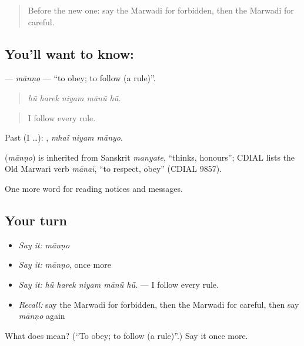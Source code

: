 \label{lesson:MW-C191-manno}



\begin{quote}
Before the new one: say the Marwadi for forbidden, then the Marwadi for careful.
\end{quote}

\subsection*{You'll want to know: }
\textbf{} — \emph{mānṇo} — \textquotedblleft{}to obey; to follow (a rule)\textquotedblright{}.

\begin{quote}
    
\end{quote}

\begin{quote}
\emph{hū̃ harek niyam mānū̃ hū̃.}
\end{quote}

\begin{quote}
I follow every rule.
\end{quote}

Past (I …):   , \emph{mhaĩ niyam mānyo}.

\begin{cousinweb}
\textbf{} (\emph{mānṇo}) is inherited from Sanskrit \emph{manyate}, \textquotedblleft{}thinks, honours\textquotedblright{}; CDIAL lists the Old Marwari verb \emph{mānaï}, \textquotedblleft{}to respect, obey\textquotedblright{} (CDIAL 9857).
\end{cousinweb}

\begin{grammarlens}[title={What you've built}]
One more word for reading notices and messages.
\end{grammarlens}

\subsection*{Your turn}
\begin{itemize}
\raggedright
  \item \emph{Say it:} \emph{mānṇo}
  \item \emph{Say it:} \emph{mānṇo}, once more
  \item \emph{Say it:} \emph{hū̃ harek niyam mānū̃ hū̃.} — I follow every rule.
  \item \emph{Recall:} say the Marwadi for forbidden, then the Marwadi for careful, then say \emph{mānṇo} again
\end{itemize}

\begin{tcolorbox}[breakable,colback=teal!4,colframe=teal!35!black,title={Before you move on}]
What does  mean? (\textquotedblleft{}To obey; to follow (a rule)\textquotedblright{}.) Say it once more.
\end{tcolorbox}

